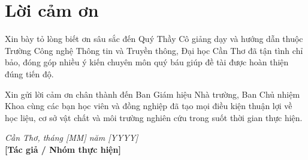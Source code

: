 
\chapter*{Lời cảm ơn}

Xin bày tỏ lòng biết ơn sâu sắc đến Quý Thầy Cô giảng dạy và hướng dẫn thuộc Trường Công nghệ Thông tin và Truyền thông, Đại học Cần Thơ đã tận tình chỉ bảo, đóng góp nhiều ý kiến chuyên môn quý báu giúp đề tài được hoàn thiện đúng tiến độ.

Xin gửi lời cảm ơn chân thành đến Ban Giám hiệu Nhà trường, Ban Chủ nhiệm Khoa cùng các bạn học viên và đồng nghiệp đã tạo mọi điều kiện thuận lợi về học liệu, cơ sở vật chất và môi trường nghiên cứu trong suốt thời gian thực hiện.

\vspace{1cm}
\begin{flushright}
  \textit{Cần Thơ, tháng [MM] năm [YYYY]}\\[0.5em]
  \textbf{[Tác giả / Nhóm thực hiện]}
\end{flushright}
